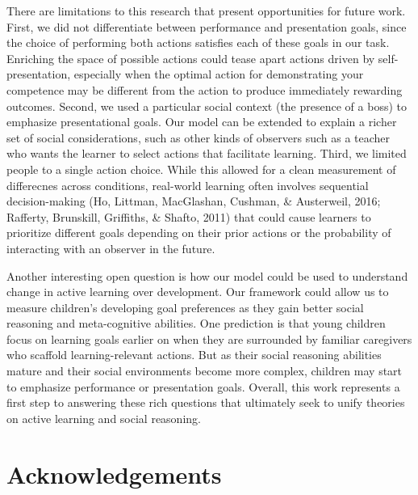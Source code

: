 \documentclass[10pt, letterpaper]{article}
\begin{document}
There are limitations to this research that present opportunities for
future work. First, we did not differentiate between performance and
presentation goals, since the choice of performing both actions
satisfies each of these goals in our task. Enriching the space of
possible actions could tease apart actions driven by self-presentation,
especially when the optimal action for demonstrating your competence may
be different from the action to produce immediately rewarding outcomes.
Second, we used a particular social context (the presence of a boss) to
emphasize presentational goals. Our model can be extended to explain a
richer set of social considerations, such as other kinds of observers
such as a teacher who wants the learner to select actions that
facilitate learning. Third, we limited people to a single action choice.
While this allowed for a clean measurement of differecnes across
conditions, real-world learning often involves sequential
decision-making (Ho, Littman, MacGlashan, Cushman, \& Austerweil, 2016;
Rafferty, Brunskill, Griffiths, \& Shafto, 2011) that could cause
learners to prioritize different goals depending on their prior actions
or the probability of interacting with an observer in the future.

Another interesting open question is how our model could be used to
understand change in active learning over development. Our framework
could allow us to measure children's developing goal preferences as they
gain better social reasoning and meta-cognitive abilities. One
prediction is that young children focus on learning goals earlier on
when they are surrounded by familiar caregivers who scaffold
learning-relevant actions. But as their social reasoning abilities
mature and their social environments become more complex, children may
start to emphasize performance or presentation goals. Overall, this work
represents a first step to answering these rich questions that
ultimately seek to unify theories on active learning and social
reasoning.

\vspace{1em}

\vspace{1em} \noindent

\hypertarget{acknowledgements}{%
\section{Acknowledgements}\label{acknowledgements}}
\end{document}
